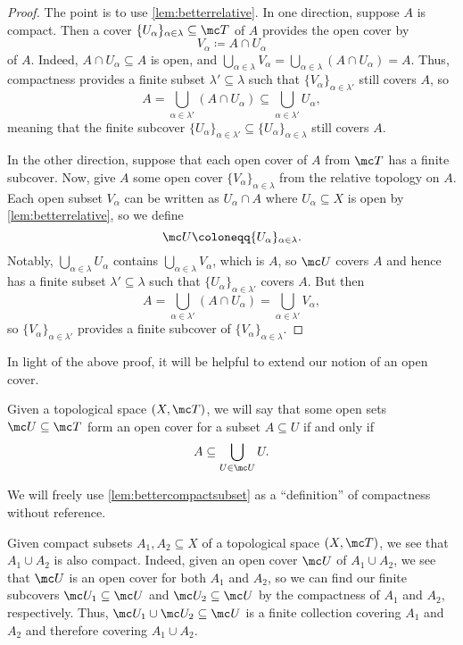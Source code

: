 \documentclass[../notes.tex]{subfiles}
\begin{document}
\begin{proof}
	The point is to use \autoref{lem:betterrelative}. In one direction, suppose $A$ is compact. Then a cover $\{U_\alpha\}_{\alpha\in\lambda}\subseteq\mc T$ of $A$ provides the open cover by
	\[V_\alpha\coloneqq A\cap U_\alpha\]
	of $A$. Indeed, $A\cap U_\alpha\subseteq A$ is open, and $\bigcup_{\alpha\in\lambda}V_\alpha=\bigcup_{\alpha\in\lambda}(A\cap U_\alpha)=A$. Thus, compactness provides a finite subset $\lambda'\subseteq\lambda$ such that $\{V_\alpha\}_{\alpha\in\lambda'}$ still covers $A$, so
	\[A=\bigcup_{\alpha\in\lambda'}(A\cap U_\alpha)\subseteq\bigcup_{\alpha\in\lambda'}U_\alpha,\]
	meaning that the finite subcover $\{U_\alpha\}_{\alpha\in\lambda'}\subseteq\{U_\alpha\}_{\alpha\in\lambda}$ still covers $A$.
	
	In the other direction, suppose that each open cover of $A$ from $\mc T$ has a finite subcover. Now, give $A$ some open cover $\{V_\alpha\}_{\alpha\in\lambda}$ from the relative topology on $A$. Each open subset $V_\alpha$ can be written as $U_\alpha\cap A$ where $U_\alpha\subseteq X$ is open by \autoref{lem:betterrelative}, so we define
	\[\mc U\coloneqq\{U_\alpha\}_{\alpha\in\lambda}.\]
	Notably, $\bigcup_{\alpha\in\lambda}U_\alpha$ contains $\bigcup_{\alpha\in\lambda}V_\alpha$, which is $A$, so $\mc U$ covers $A$ and hence has a finite subset $\lambda'\subseteq\lambda$ such that $\{U_\alpha\}_{\alpha\in\lambda'}$ covers $A$. But then
	\[A=\bigcup_{\alpha\in\lambda'}(A\cap U_\alpha)=\bigcup_{\alpha\in\lambda'}V_\alpha,\]
	so $\{V_\alpha\}_{\alpha\in\lambda'}$ provides a finite subcover of $\{V_\alpha\}_{\alpha\in\lambda}$.
\end{proof}
In light of the above proof, it will be helpful to extend our notion of an open cover.
\begin{notation}
	Given a topological space $(X,\mc T)$, we will say that some open sets $\mc U\subseteq\mc T$ form an open cover for a subset $A\subseteq U$ if and only if
	\[A\subseteq\bigcup_{U\in\mc U}U.\]
\end{notation}
\begin{remark}
	We will freely use \autoref{lem:bettercompactsubset} as a ``definition'' of compactness without reference.
\end{remark}
\begin{example} \label{ex:finite-union-compacts}
	Given compact subsets $A_1,A_2\subseteq X$ of a topological space $(X,\mc T)$, we see that $A_1\cup A_2$ is also compact. Indeed, given an open cover $\mc U$ of $A_1\cup A_2$, we see that $\mc U$ is an open cover for both $A_1$ and $A_2$, so we can find our finite subcovers $\mc U_1\subseteq\mc U$ and $\mc U_2\subseteq\mc U$ by the compactness of $A_1$ and $A_2$, respectively. Thus, $\mc U_1\cup\mc U_2\subseteq\mc U$ is a finite collection covering $A_1$ and $A_2$ and therefore covering $A_1\cup A_2$.
\end{example}
\end{document}

